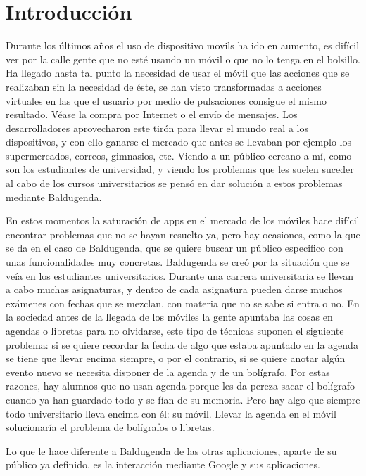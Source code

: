 \chapter{Introducción}

Durante los últimos años el uso de \glspl{dispositivo movil} ha ido en aumento, es difícil ver por la calle gente que no esté usando un móvil o que no lo tenga en el bolsillo. Ha llegado hasta tal punto la necesidad de usar el móvil que las acciones que se realizaban sin la necesidad de éste, se han visto transformadas a acciones virtuales en las que el usuario por medio de pulsaciones consigue el mismo resultado. Véase la compra por Internet o el envío de mensajes.
Los desarrolladores aprovecharon este tirón para llevar el mundo real a los dispositivos, y con ello ganarse el mercado que antes se llevaban por ejemplo los supermercados, correos, gimnasios, etc.
Viendo a un público cercano a mí, como son los estudiantes de universidad, y viendo los problemas que les suelen suceder al cabo de los cursos universitarios se pensó en dar solución a estos problemas mediante Baldugenda.

En estos momentos la saturación de  \acrshort{app}s en el mercado de los móviles hace difícil encontrar problemas que no se hayan resuelto ya, pero hay ocasiones, como la que se da en el caso de Baldugenda, que se quiere buscar un público especifico con unas funcionalidades muy concretas. Baldugenda se creó por la situación que se veía en los estudiantes universitarios. Durante una carrera universitaria se llevan a cabo muchas asignaturas, y dentro de cada asignatura pueden darse muchos exámenes con fechas que se mezclan, con materia que no se sabe si entra o no. En la sociedad antes de la llegada de los móviles la gente apuntaba las cosas en agendas o libretas para no olvidarse, este tipo de técnicas suponen el siguiente problema: si se quiere recordar la fecha de algo que estaba apuntado en la agenda se tiene que llevar encima siempre, o por el contrario, si se quiere anotar algún evento nuevo se necesita disponer de la agenda y de un bolígrafo. Por estas razones, hay alumnos que no usan agenda porque les da pereza sacar el bolígrafo cuando ya han guardado todo y se fían de su memoria. Pero hay algo que siempre todo universitario lleva encima con él: su móvil. Llevar la agenda en el móvil solucionaría el problema de bolígrafos o libretas. 

Lo que le hace diferente a Baldugenda de las otras aplicaciones, aparte de su público ya definido, es la interacción mediante Google y sus aplicaciones.

